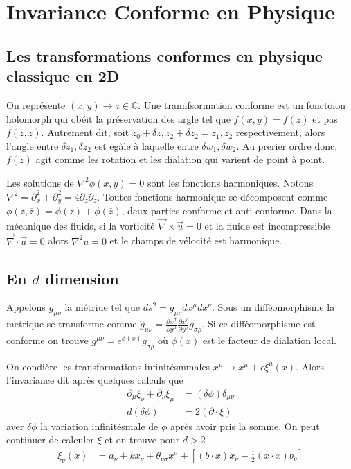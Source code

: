 \documentclass[10pt]{report}
\newcommand{\pd}[2]{\frac{\partial #1}{\partial#2}}
\begin{document}
\section{Invariance Conforme en Physique}

\subsection{Les transformations conformes en physique classique en 2D}

On repr\'esente $(x,y) \to z \in \mathbb{C}$. Une trannfsormation conforme est un fonctoion holomorph qui ob\'eit la pr\'eservation des argle tel que $f(x,y) = f(z)$ et pas $f(z,\overline{z})$. Autrement dit, soit $z_0 + \delta z, z_2 + \delta z_2 = z_1, z_2$ respectivement, alors l'angle entre $\delta z_1, \delta z_2$ est eg\`ale \`a laquelle entre $\delta w_1, \delta w_2$. Au prerier ordre donc, $f(z)$ agit comme les rotation et les dialation qui varient de point \`a point.

Les solutions de $\nabla^2 \phi(x,y) = 0$ sont les fonctions harmoniques. Notons $\nabla^2 = \partial_x^2 + \partial_y^2 = 4\partial_z \partial_{\overline{z}}$. Toutes fonctions harmonique se d\'ecomposent comme $\phi(z,\overline{z}) = \phi(z) + \phi(\overline{z})$, deux parties conforme et anti-conforme. Dans la m\'ecanique des fluids, si la vorticit\'e $\vec{\nabla} \times \vec{u} = 0$ et la fluide est incompressible $\vec{\nabla} \cdot \vec{u} = 0$ alors $\nabla^2 u = 0$ et le champs de v\'elocit\'e est harmonique.

\subsection{En $d$ dimension}

Appelons $g_{\mu \nu}$ la m\'etriue tel que $ds^2 = g_{\mu\nu}dx^\mu dx^\nu$. Sous un diff\'eomorphisme la metrique se transforme comme $\hat{g}_{\mu\nu} = \pd{x^\sigma}{y^\mu}\pd{x^\rho}{y^\nu}g_{\sigma\rho}$. Si ce diff\'eomorphisme est conforme on trouve $g^{\mu\nu} = e^{\phi(x)}g_{\sigma\rho}$ o\`u $\phi(x)$ est le facteur de dialation local.

On condi\`ere les transformations infinit\'esmmales $x^\mu \to x^\mu + \epsilon \xi^\mu(x)$. Alors l'invariance dit apr\`es quelques calculs que
\begin{align}
    \partial_\mu \xi_\nu + \partial_\nu \xi_\mu &= (\delta \phi)\delta_{\mu \nu}\\
    d\left( \delta \phi \right) &= 2\left( \partial \cdot \xi \right)
\end{align}
aver $\delta \phi$ la variation infinit\'esmale de $\phi$ apr\`es avoir pris la somme. On peut continuer de calculer $\xi$ et on trouve pour $d > 2$
\begin{align}
    \xi_\nu(x) &= a_\nu + k x_{\nu} + \theta_{\nu\sigma}x^\sigma + \left[ (b \cdot x)x_\nu - \frac{1}{2}(x \cdot x)b_\nu \right]
\end{align}
\end{document}
